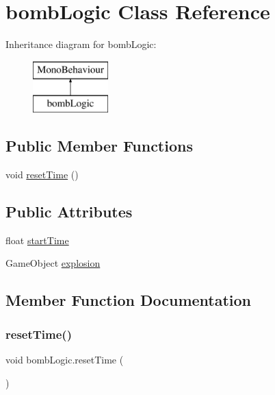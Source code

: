 \hypertarget{classbomb_logic}{}\section{bomb\+Logic Class Reference}
\label{classbomb_logic}
Inheritance diagram for bomb\+Logic\+:\begin{figure}[H]
\begin{center}
\leavevmode
\includegraphics[height=2.000000cm]{classbomb_logic}
\end{center}
\end{figure}
\subsection*{Public Member Functions}
\begin{DoxyCompactItemize}
\item 
void \hyperlink{classbomb_logic_ae905cf9c5b66b2f88fda2c9c56ad544e}{reset\+Time} ()
\end{DoxyCompactItemize}
\subsection*{Public Attributes}
\begin{DoxyCompactItemize}
\item 
float \hyperlink{classbomb_logic_a228ae603f0d01e43eb67c2c5dea04a96}{start\+Time}
\item 
Game\+Object \hyperlink{classbomb_logic_ac6665f96ce4dd6eb83e5f3e7aff71f40}{explosion}
\end{DoxyCompactItemize}


\subsection{Member Function Documentation}
\mbox{\label{classbomb_logic_ae905cf9c5b66b2f88fda2c9c56ad544e}} 
\subsubsection{\texorpdfstring{reset\+Time()}{resetTime()}}
{\footnotesize\ttfamily void bomb\+Logic.\+reset\+Time (\begin{DoxyParamCaption}{ }\end{DoxyParamCaption})}



